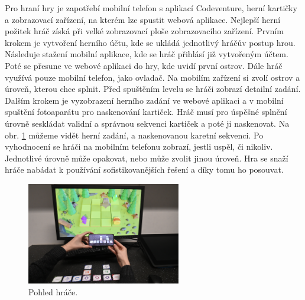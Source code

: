 Pro hraní hry je zapotřebí mobilní telefon s aplikací Codeventure, herní kartičky a zobrazovací zařízení, na kterém lze spustit webová aplikace. Nejlepší herní požitek hráč získá při velké zobrazovací ploše zobrazovacího zařízení. Prvním krokem je vytvoření herního účtu, kde se ukládá jednotlivý hráčův postup hrou. Následuje stažení mobilní aplikace, kde se hráč přihlásí již vytvořeným účtem. Poté se přesune ve webové aplikaci do hry, kde uvidí první ostrov. Dále hráč využívá pouze mobilní telefon, jako ovladač. Na mobilím zařízení si zvolí ostrov a úroveň, kterou chce splnit. Před spuštěním levelu se hráči zobrazí detailní zadání. Dalším krokem je vyzobrazení herního zadání ve webové aplikaci a v mobilní spuštění fotoaparátu pro naskenování kartiček. Hráč musí pro úspěšné splnění úrovně seskládat validní a správnou sekvenci kartiček a poté ji naskenovat. Na obr. \ref{fig:pohled-hrace} můžeme vidět herní zadání, a naskenovanou karetní sekvenci. Po vyhodnocení se hráči na mobilním telefonu zobrazí, jestli uspěl, či nikoliv. Jednotlivé úrovně může opakovat, nebo může zvolit jinou úroveň. Hra se snaží hráče nabádat k používání sofistikovanějších řešení a díky tomu ho posouvat. 

\begin{figure}[h]
    \centering
    \includegraphics[width=0.6\textwidth]{img/pohled-hrace.png}
    \caption{Pohled hráče.}
    \label{fig:pohled-hrace}
\end{figure}